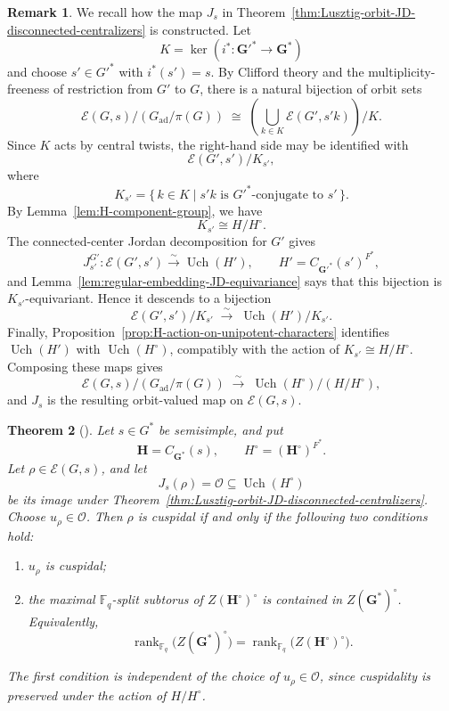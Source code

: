 \documentclass{amsart}
\theoremstyle{plain}
\numberwithin{equation}{section}
\newtheorem{theorem}{Theorem}[section]
\theoremstyle{definition}
\newtheorem{remark}[theorem]{Remark}
\newcommand{\cE}{\mathcal{E}}
\newcommand{\fq}{\mathbb{F}_{q}}
\newcommand{\Uch}{\operatorname{Uch}}
\newcommand{\ad}{\operatorname{ad}}
\newcommand{\bG}{\mathbf{G}}
\newcommand{\bH}{\mathbf{H}}
\begin{document}
\begin{remark}
We recall how the map \(J_s\) in Theorem~\ref{thm:Lusztig-orbit-JD-disconnected-centralizers} is
constructed.  Let
\[
K=\ker(i^*:\bG'^*\to\bG^*)
\]
and choose \(s'\in G'^*\) with \(i^*(s')=s\).  By Clifford theory and the
multiplicity-freeness of restriction from \(G'\) to \(G\), there is a natural
bijection of orbit sets
\[
\cE(G,s)/(G_{\ad}/\pi(G))
\;\cong\;
\left(\bigcup_{k\in K}\cE(G',s'k)\right)/K.
\]
Since \(K\) acts by central twists, the right-hand side may be identified with
\[
\cE(G',s')/K_{s'},
\]
where
\[
K_{s'}=\{\,k\in K\mid s'k \text{ is }G'^*\text{-conjugate to }s'\,\}.
\]
By Lemma~\ref{lem:H-component-group}, we have
\[
K_{s'}\cong H/H^\circ.
\]
The connected-center Jordan decomposition for \(G'\) gives
\[
J_{s'}^{G'}:\cE(G',s')\xrightarrow{\sim}\Uch(H'),
\qquad
H'=C_{\bG'^*}(s')^{F^*},
\]
and Lemma~\ref{lem:regular-embedding-JD-equivariance} says that this bijection is
\(K_{s'}\)-equivariant.  Hence it descends to a bijection
\[
\cE(G',s')/K_{s'}
\;\xrightarrow{\sim}\;
\Uch(H')/K_{s'}.
\]
Finally, Proposition~\ref{prop:H-action-on-unipotent-characters} identifies \(\Uch(H')\) with
\(\Uch(H^\circ)\), compatibly with the action of
\(K_{s'}\cong H/H^\circ\).  Composing these maps gives
\[
\cE(G,s)/(G_{\ad}/\pi(G))
\;\xrightarrow{\sim}\;
\Uch(H^\circ)/(H/H^\circ),
\]
and \(J_s\) is the resulting orbit-valued map on \(\cE(G,s)\).
\end{remark}

\begin{theorem}[{\cite[Theorem~3.2.22]{Book:GeckandMalle}}]
\label{fact:cuspidal}
Let \(s\in G^*\) be semisimple, and put
\[
\bH=C_{\bG^*}(s),
\qquad
H^\circ=(\bH^\circ)^{F^*}.
\]
Let \(\rho\in\cE(G,s)\), and let
\[
J_s(\rho)=\mathcal O\subseteq \Uch(H^\circ)
\]
be its image under Theorem~\ref{thm:Lusztig-orbit-JD-disconnected-centralizers}.  Choose
\(u_\rho\in\mathcal O\).  Then \(\rho\) is cuspidal if and only if the
following two conditions hold:
\begin{enumerate}
    \item \(u_\rho\) is cuspidal;

    \item the maximal \(\fq\)-split subtorus of \(Z(\bH^\circ)^\circ\) is
    contained in \(Z(\bG^*)^\circ\).  Equivalently,
    \[
    \operatorname{rank}_{\fq}\bigl(Z(\bG^*)^\circ\bigr)
    =
    \operatorname{rank}_{\fq}\bigl(Z(\bH^\circ)^\circ\bigr).
    \]
\end{enumerate}
The first condition is independent of the choice of \(u_\rho\in\mathcal O\),
since cuspidality is preserved under the action of \(H/H^\circ\).
\end{theorem}
\end{document}

